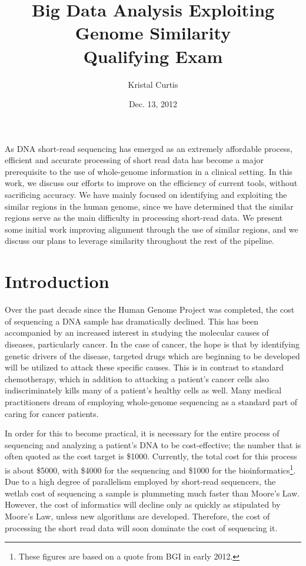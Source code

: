 \documentclass[twocolumn,10pt]{article}
\begin{document}
\title{Big Data Analysis Exploiting Genome Similarity\\Qualifying Exam}
\author{Kristal Curtis}
\date{Dec. 13, 2012}
\maketitle

\abstract

As DNA short-read sequencing has emerged as an extremely affordable process, efficient and accurate processing of short read data has become a major prerequisite to the use of whole-genome information in a clinical setting.  In this work, we discuss our efforts to improve on the efficiency of current tools, without sacrificing accuracy.  We have mainly focused on identifying and exploiting the similar regions in the human genome, since we have determined that the similar regions serve as the main difficulty in processing short-read data.  We present some initial work improving alignment through the use of similar regions, and we discuss our plans to leverage similarity throughout the rest of the pipeline.

\section{Introduction} 

Over the past decade since the Human Genome Project was completed, the cost of sequencing a DNA sample has dramatically declined.  This has been accompanied by an increased interest in studying the molecular causes of diseases, particularly cancer.  In the case of cancer, the hope is that by identifying genetic drivers of the disease, targeted drugs which are beginning to be developed will be utilized to attack these specific causes.  This is in contrast to standard chemotherapy, which in addition to attacking a patient's cancer cells also indiscriminately kills many of a patient's healthy cells as well.  Many medical practitioners dream of employing whole-genome sequencing as a standard part of caring for cancer patients.

In order for this to become practical, it is necessary for the entire process of sequencing and analyzing a patient's DNA to be cost-effective; the number that is often quoted as the cost target is \$1000.  Currently, the total cost for this process is about \$5000, with \$4000 for the sequencing and \$1000 for the bioinformatics\footnote{These figures are based on a quote from BGI in early 2012.}.  Due to a high degree of parallelism employed by short-read sequencers, the wetlab cost of sequencing a sample is plummeting much faster than Moore's Law.  However, the cost of informatics will decline only as quickly as stipulated by Moore's Law, unless new algorithms are developed.  Therefore, the cost of processing the short read data will soon dominate the cost of sequencing it.
\end{document}
